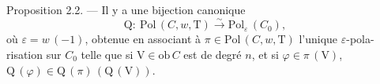 Proposition 2.2. --- Il y a une bijection canonique
\[ \mathrm{Q} : \ \mathrm{Pol}\,(C, w, \mathrm{T}) \xrightarrow{\sim} \mathrm{Pol}_\varepsilon\,(C_0), \]
où $\varepsilon = w\,(-1)$, obtenue en associant à $\pi \in \mathrm{Pol}\,(C, w, \mathrm{T})$ l'unique $\varepsilon$-pola-%
risation sur $C_0$ telle que si $\mathrm{V} \in \mathrm{ob}\,C$ est de degré $n$, et si $\varphi \in \pi\,(\mathrm{V})$,
$\mathrm{Q}\,(\varphi) \in \mathrm{Q}\,(\pi)\,(\mathrm{Q}\,(\mathrm{V}))$.

